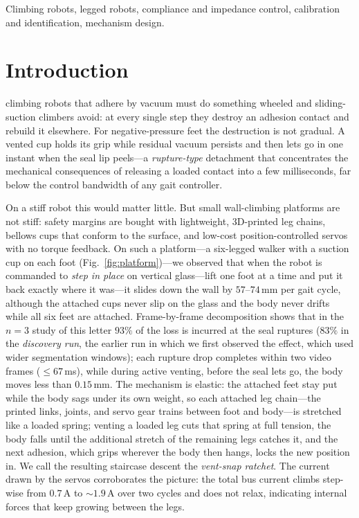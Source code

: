 \documentclass[journal]{IEEEtran}
\begin{document}
\begin{IEEEkeywords}
Climbing robots, legged robots, compliance and impedance control,
calibration and identification, mechanism design.
\end{IEEEkeywords}

\section{Introduction}
\label{sec:intro}

 climbing robots that adhere by vacuum must do
something wheeled and sliding-suction climbers avoid: at every single
step they destroy an adhesion contact and rebuild it elsewhere. For
negative-pressure feet the destruction is not gradual. A vented cup holds
its grip while residual vacuum persists and then lets go in one instant
when the seal lip peels---a \emph{rupture-type} detachment that
concentrates the mechanical consequences of releasing a loaded contact
into a few milliseconds, far below the control bandwidth of any gait
controller.

On a stiff robot this would matter little. But small wall-climbing
platforms are not stiff: safety margins are bought with lightweight,
3D-printed leg chains, bellows cups that conform to the surface, and
low-cost position-controlled servos with no torque feedback. On such a
platform---a six-legged walker with a suction cup on each foot
(Fig.~\ref{fig:platform})---we observed that when the robot is commanded
to \emph{step in place} on vertical glass---lift one foot at a time and
put it back exactly where it was---it slides down the wall by
$57$--$74$\,mm per gait cycle, although the attached cups never slip on
the glass and the body never drifts while all six feet are attached.
Frame-by-frame decomposition shows that in the $n{=}3$ study of this
letter $93\%$ of the loss is incurred at the seal ruptures ($83\%$ in
the \emph{discovery run}, the earlier run in which we first observed
the effect, which used wider segmentation windows); each rupture drop
completes within two video frames ($\le67$\,ms), while during active
venting, before the seal lets go, the body moves less than
$0.15$\,mm. The mechanism is elastic: the attached feet stay put
while the body sags under its own weight, so each attached leg
chain---the printed links, joints, and servo gear trains between foot
and body---is stretched like a loaded spring; venting a loaded leg cuts
that spring at full tension, the body falls until the additional stretch
of the remaining legs catches it, and the next adhesion, which grips
wherever the body then hangs, locks the new position in. We call the
resulting staircase descent the \emph{vent-snap ratchet}. The current
drawn by the servos corroborates the picture: the total bus current
climbs step-wise from $0.7$\,A to ${\sim}1.9$\,A over two cycles and
does not relax, indicating internal forces that keep growing between
the legs.
\end{document}
